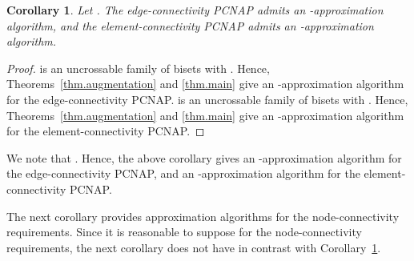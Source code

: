 \documentclass[11pt]{article}
\newtheorem{corollary}{Corollary}
\begin{document}
\begin{corollary}\label{cor.edge-element}
 Let .
 The edge-connectivity PCNAP admits an -approximation
 algorithm, and
 the element-connectivity PCNAP admits an -approximation
 algorithm.
 \end{corollary}
\begin{proof}
 is an uncrossable family of bisets with .
 Hence, Theorems~\ref{thm.augmentation} and \ref{thm.main} give
 an -approximation algorithm for the edge-connectivity PCNAP.
 is an uncrossable family of bisets
 with .
 Hence, Theorems~\ref{thm.augmentation} and \ref{thm.main} give
 an -approximation algorithm for the element-connectivity PCNAP.
\end{proof}

We note that 
. Hence, the above corollary gives
an -approximation algorithm for the edge-connectivity
PCNAP,
and an -approximation algorithm for the element-connectivity
PCNAP.

The next corollary provides approximation algorithms for the
node-connectivity requirements.
Since it is reasonable to suppose  for the node-connectivity
requirements,
the next corollary does not have  in contrast with Corollary~\ref{cor.edge-element}.
\end{document}
